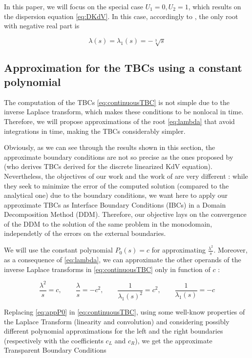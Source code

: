 \indent In this paper, we will focus on the special case $U_1 = 0, U_2 = 1$, which results on the dispersion equation \eqref{eq:DKdV}. In this case, accordingly to \cite{zheng2008}, the only root with negative real part is 

\begin{equation}
	\label{eq:lambda}
			\lambda(s) = \lambda_1(s) =  -\sqrt[3]{s} 
\end{equation}

\subsection{Approximation for the TBCs using a constant polynomial}

\indent The computation of the TBCs \eqref{eq:continuousTBC} is not simple due to the inverse Laplace transform, which makes these conditions to be nonlocal in time. Therefore, we will propose approximations of the root \eqref{eq:lambda} that avoid integrations in time, making the TBCs considerably simpler.

\indent Obviously, as we can see through the results shown in this section, the approximate boundary conditions are not so precise as the ones proposed by \cite{besse2015} (who derives TBCs derived for the discrete linearized KdV equation). Nevertheless, the objectives of our work and the work of \cite{besse2015} are very different : while they seek to minimize the error of the computed solution (compared to the analytical one) due to the boundary conditions, we want here to apply our approximate TBCs as Interface Boundary Conditions (IBCs) in a Domain Decomposition Method (DDM). Therefore, our objective lays on the convergence of the DDM to the solution of the same problem in the monodomain, independetly of the errors on the external boundaries. 

\indent We will use the constant polynomial $P_0(s) = c$ for approximating $\frac{\lambda^2}{s}$. Moreover, as a consequence of \eqref{eq:lambda}, we can approximate the other operands of the inverse Laplace transforms in \eqref{eq:continuousTBC} only in function of $c$ :

\begin{equation}
	\label{eq:appP0}
	\frac{\lambda^2}{s}  = c, \qquad
	\frac{\lambda}{s}  = -c^2, \qquad
	\frac{1}{\lambda_1(s)^2}  = c^2, \qquad 
	 \frac{1}{\lambda_1(s)}  = -c 
\end{equation}

\indent Replacing \eqref{eq:appP0} in \eqref{eq:continuousTBC}, using some well-know properties of the Laplace Transform (linearity and convolution) and considering possibly different polynomial approximations for the left and the right boundaries (respectively with the coefficients $c_L$ and $c_R$), we get the approximate Transparent Boundary Conditions

